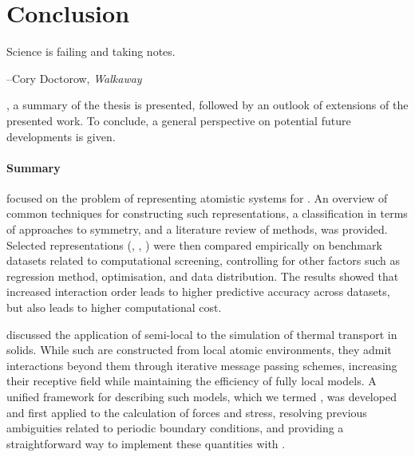 
\part{Conclusion}
\label{part:end}

\thispagestyle{plain}
\begin{center}
  \begin{minipage}{0.8\textwidth}

    \vspace{4\baselineskip}

    Science is failing and taking notes.

    \vspace{\baselineskip}
    {\hfill\raggedright --Cory Doctorow, \textit{Walkaway}\hspace{0.25cm}}
  \end{minipage}
\end{center}
\vspace{2\baselineskip}

, a summary of the thesis is presented, followed by an outlook of extensions of the presented work. To conclude, a general perspective on potential future developments is given.

\subsection{Summary}

 focused on the problem of representing atomistic systems for \ml.
An overview of common techniques for constructing such representations, a classification in terms of approaches to symmetry, and a literature review of methods, was provided.
Selected representations (\sfs, \mbtr, \soap) were then compared empirically on benchmark datasets related to computational screening, controlling for other factors such as regression method, \hp optimisation, and data distribution. 
The results showed that increased interaction order leads to higher predictive accuracy across datasets, but also leads to higher computational cost.

\vspace{\baselineskip}
\noindent
{} discussed the application of semi-local \mlps to the simulation of thermal transport in solids. While such \mlps are constructed from local atomic environments, they admit interactions beyond them through iterative message passing schemes, increasing their receptive field while maintaining the efficiency of fully local models.
A unified framework for describing such models, which we termed \glps, was developed and first applied to the calculation of forces and stress, resolving previous ambiguities related to periodic boundary conditions, and providing a straightforward way to implement these quantities with \ad.

